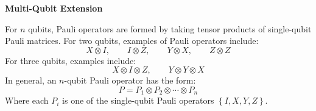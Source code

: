 \highspace
\begin{flushleft}
    \textcolor{Green3}{ \textbf{Multi-Qubit Extension}}
\end{flushleft}
For $n$ qubits, Pauli operators are formed by taking tensor products of single-qubit Pauli matrices. For two qubits, examples of Pauli operators include:
\begin{equation*}
    X \otimes I,
    \qquad
    I \otimes Z,
    \qquad
    Y \otimes X,
    \qquad
    Z \otimes Z
\end{equation*}
For three qubits, examples include:
\begin{equation*}
    X \otimes I \otimes Z,
    \qquad
    Y \otimes Y \otimes X
\end{equation*}
In general, an $n$-qubit Pauli operator has the form:
\begin{equation*}
    P = P_1 \otimes P_2 \otimes \cdots \otimes P_n
\end{equation*}
Where each $P_i$ is one of the single-qubit Pauli operators $\left\{I, X, Y, Z\right\}$.

